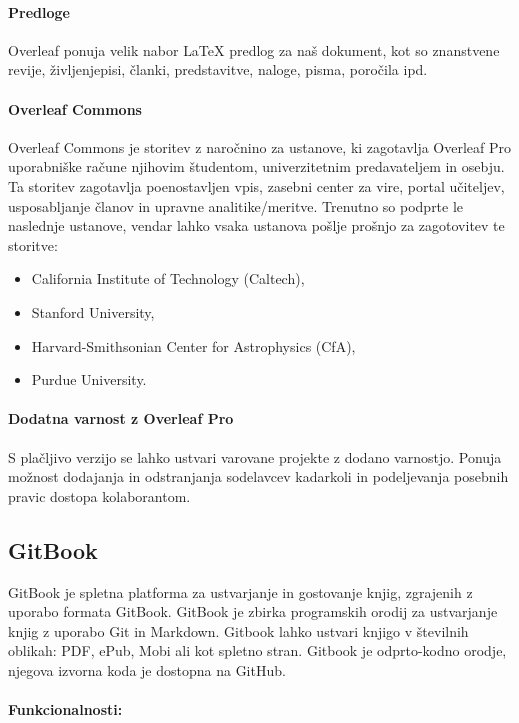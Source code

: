 \documentclass[a4paper, 12pt]{book}
\begin{document}
\paragraph{Predloge}
Overleaf ponuja velik nabor {\LaTeX} predlog za naš dokument, kot so znanstvene revije, življenjepisi, članki, predstavitve, naloge, pisma, poročila ipd.  


\paragraph{Overleaf Commons}
Overleaf Commons je storitev z naročnino za ustanove, ki zagotavlja Overleaf Pro uporabniške račune njihovim študentom, univerzitetnim predavateljem in osebju. Ta storitev zagotavlja poenostavljen vpis, zasebni center za vire, portal učiteljev, usposabljanje članov in upravne analitike/meritve. Trenutno so podprte le naslednje ustanove, vendar lahko vsaka ustanova pošlje prošnjo za zagotovitev te storitve:
\begin{itemize}
	\item California Institute of Technology (Caltech),
	\item Stanford University,
	\item Harvard-Smithsonian Center for Astrophysics (CfA),
	\item Purdue University.
\end{itemize}

\paragraph{Dodatna varnost z Overleaf Pro}
S plačljivo verzijo se lahko ustvari varovane projekte z dodano varnostjo. Ponuja možnost dodajanja in odstranjanja sodelavcev kadarkoli in podeljevanja posebnih pravic dostopa kolaborantom.


\subsection{GitBook}
GitBook je spletna platforma za ustvarjanje in gostovanje knjig, zgrajenih z uporabo formata GitBook. GitBook je zbirka programskih orodij za ustvarjanje knjig z uporabo Git in  Markdown. \cite{123} Gitbook lahko ustvari knjigo v številnih oblikah: PDF, ePub, Mobi ali kot spletno stran. Gitbook je odprto-kodno orodje, njegova izvorna koda je dostopna na GitHub.

\paragraph{Funkcionalnosti:\\}
\end{document}
